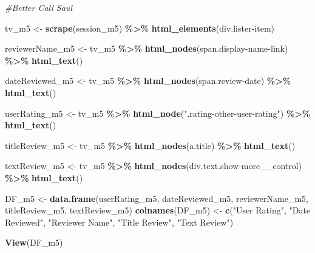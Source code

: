 \documentclass[
]{article}
\newenvironment{Shaded}{\begin{snugshade}}{\end{snugshade}}
\newcommand{\CommentTok}[1]{\textcolor[rgb]{0.56,0.35,0.01}{\textit{#1}}}
\newcommand{\FunctionTok}[1]{\textcolor[rgb]{0.13,0.29,0.53}{\textbf{#1}}}
\newcommand{\NormalTok}[1]{#1}
\newcommand{\OtherTok}[1]{\textcolor[rgb]{0.56,0.35,0.01}{#1}}
\newcommand{\SpecialCharTok}[1]{\textcolor[rgb]{0.81,0.36,0.00}{\textbf{#1}}}
\newcommand{\StringTok}[1]{\textcolor[rgb]{0.31,0.60,0.02}{#1}}
\begin{document}
\begin{Shaded}
\begin{Highlighting}[]
\CommentTok{\#Better Call Saul}

\NormalTok{tv\_m5 }\OtherTok{\textless{}{-}} \FunctionTok{scrape}\NormalTok{(session\_m5) }\SpecialCharTok{\%\textgreater{}\%} 
  \FunctionTok{html\_elements}\NormalTok{(}\StringTok{\textquotesingle{}div.lister{-}item\textquotesingle{}}\NormalTok{)}

\NormalTok{reviewerName\_m5 }\OtherTok{\textless{}{-}}\NormalTok{ tv\_m5 }\SpecialCharTok{\%\textgreater{}\%}
  \FunctionTok{html\_nodes}\NormalTok{(}\StringTok{\textquotesingle{}span.display{-}name{-}link\textquotesingle{}}\NormalTok{) }\SpecialCharTok{\%\textgreater{}\%}
  \FunctionTok{html\_text}\NormalTok{()}

\NormalTok{dateReviewed\_m5 }\OtherTok{\textless{}{-}}\NormalTok{ tv\_m5 }\SpecialCharTok{\%\textgreater{}\%}
  \FunctionTok{html\_nodes}\NormalTok{(}\StringTok{\textquotesingle{}span.review{-}date\textquotesingle{}}\NormalTok{) }\SpecialCharTok{\%\textgreater{}\%}
  \FunctionTok{html\_text}\NormalTok{()}

\NormalTok{userRating\_m5 }\OtherTok{\textless{}{-}}\NormalTok{ tv\_m5 }\SpecialCharTok{\%\textgreater{}\%} 
  \FunctionTok{html\_node}\NormalTok{(}\StringTok{".rating{-}other{-}user{-}rating"}\NormalTok{) }\SpecialCharTok{\%\textgreater{}\%} 
  \FunctionTok{html\_text}\NormalTok{()}

\NormalTok{titleReview\_m5 }\OtherTok{\textless{}{-}}\NormalTok{ tv\_m5 }\SpecialCharTok{\%\textgreater{}\%}
  \FunctionTok{html\_nodes}\NormalTok{(}\StringTok{\textquotesingle{}a.title\textquotesingle{}}\NormalTok{) }\SpecialCharTok{\%\textgreater{}\%}
  \FunctionTok{html\_text}\NormalTok{()}

\NormalTok{textReview\_m5 }\OtherTok{\textless{}{-}}\NormalTok{ tv\_m5 }\SpecialCharTok{\%\textgreater{}\%}
  \FunctionTok{html\_nodes}\NormalTok{(}\StringTok{\textquotesingle{}div.text.show{-}more\_\_control\textquotesingle{}}\NormalTok{) }\SpecialCharTok{\%\textgreater{}\%}
  \FunctionTok{html\_text}\NormalTok{()}

\NormalTok{DF\_m5 }\OtherTok{\textless{}{-}} \FunctionTok{data.frame}\NormalTok{(userRating\_m5, dateReviewed\_m5, reviewerName\_m5, titleReview\_m5, textReview\_m5)}
\FunctionTok{colnames}\NormalTok{(DF\_m5) }\OtherTok{\textless{}{-}} \FunctionTok{c}\NormalTok{(}\StringTok{"User Rating"}\NormalTok{, }\StringTok{"Date Reviewed"}\NormalTok{, }\StringTok{"Reviewer Name"}\NormalTok{, }\StringTok{"Title Review"}\NormalTok{, }\StringTok{"Text Review"}\NormalTok{)}

\FunctionTok{View}\NormalTok{(DF\_m5)}
\end{Highlighting}
\end{Shaded}
\end{document}
